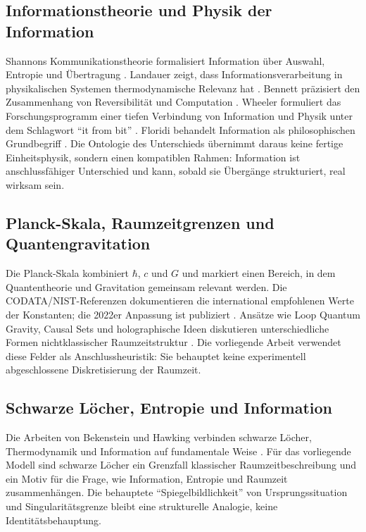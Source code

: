 \documentclass[11pt,a4paper]{article}
\theoremstyle{remark}
\begin{document}
\subsection{Informationstheorie und Physik der Information}
Shannons Kommunikationstheorie formalisiert Information über Auswahl, Entropie und Übertragung \parencite{shannon1948}. Landauer zeigt, dass Informationsverarbeitung in physikalischen Systemen thermodynamische Relevanz hat \parencite{landauer1961}. Bennett präzisiert den Zusammenhang von Reversibilität und Computation \parencite{bennett1982}. Wheeler formuliert das Forschungsprogramm einer tiefen Verbindung von Information und Physik unter dem Schlagwort \enquote{it from bit} \parencite{wheeler1990}. Floridi behandelt Information als philosophischen Grundbegriff \parencite{floridi2011}. Die Ontologie des Unterschieds übernimmt daraus keine fertige Einheitsphysik, sondern einen kompatiblen Rahmen: Information ist anschlussfähiger Unterschied und kann, sobald sie Übergänge strukturiert, real wirksam sein.

\subsection{Planck-Skala, Raumzeitgrenzen und Quantengravitation}
Die Planck-Skala kombiniert $\hbar$, $c$ und $G$ und markiert einen Bereich, in dem Quantentheorie und Gravitation gemeinsam relevant werden. Die CODATA/NIST-Referenzen dokumentieren die international empfohlenen Werte der Konstanten; die 2022er Anpassung ist publiziert \parencite{mohr2025,nistConstants,nistPlanckLength,nistPlanckTime}. Ansätze wie Loop Quantum Gravity, Causal Sets und holographische Ideen diskutieren unterschiedliche Formen nichtklassischer Raumzeitstruktur \parencite{rovelli2004,thiemann2007,bombelli1987,tHooft1993,susskind1995}. Die vorliegende Arbeit verwendet diese Felder als Anschlussheuristik: Sie behauptet keine experimentell abgeschlossene Diskretisierung der Raumzeit.

\subsection{Schwarze Löcher, Entropie und Information}
Die Arbeiten von Bekenstein und Hawking verbinden schwarze Löcher, Thermodynamik und Information auf fundamentale Weise \parencite{bekenstein1973,hawking1975,bekenstein2003}. Für das vorliegende Modell sind schwarze Löcher ein Grenzfall klassischer Raumzeitbeschreibung und ein Motiv für die Frage, wie Information, Entropie und Raumzeit zusammenhängen. Die behauptete \enquote{Spiegelbildlichkeit} von Ursprungssituation und Singularitätsgrenze bleibt eine strukturelle Analogie, keine Identitätsbehauptung.
\end{document}
